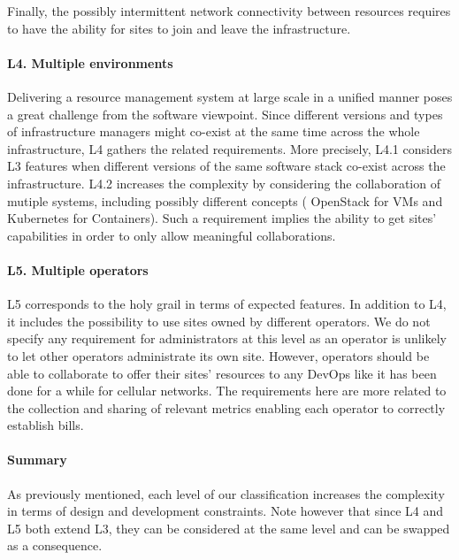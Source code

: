 Finally, the possibly intermittent network connectivity between \edge resources
requires to have the ability for sites to join and leave the
infrastructure.


\paragraph{L4. Multiple \cloud environments}
Delivering a resource management system at large scale in a unified manner %
poses a great challenge from the software viewpoint. Since different versions and types
of infrastructure managers might co-exist at the same time across the whole
infrastructure, L4 gathers the related requirements.
%
More precisely, L4.1 considers L3 features when different versions of the same software stack co-exist across the infrastructure.
%
L4.2 increases the complexity by considering  the collaboration of mutiple systems, including possibly different concepts (\eg
OpenStack for VMs and Kubernetes for Containers).
%
Such a requirement implies the ability to get sites' capabilities in order to
only allow meaningful collaborations.

\paragraph{L5. Multiple operators}
L5 corresponds to the holy grail in terms of expected features. In addition to
L4, it includes the possibility to use sites owned by different operators. %
We do not specify any requirement for
administrators at this level as an operator is unlikely to let other operators administrate
its own site. However, operators should be able to collaborate to offer their
sites' resources to any DevOps like it has been done for a while for cellular
networks. The requirements here are more related to the collection and sharing of
relevant metrics enabling each operator to correctly establish bills.

\paragraph{Summary}
As previously mentioned, each level of our classification increases the
complexity in terms of design and development constraints. Note however that
since L4 and L5 both extend L3, they can be considered at the same level and
can be swapped as a consequence.

